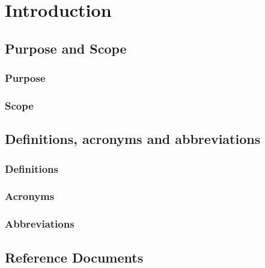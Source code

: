 \section{Introduction}
\subsection{Purpose and Scope}
\subsubsection{Purpose}
\subsubsection{Scope}
\subsection{Definitions, acronyms and abbreviations}
\subsubsection{Definitions}
\subsubsection{Acronyms}
\subsubsection{Abbreviations}
\subsection{Reference Documents}